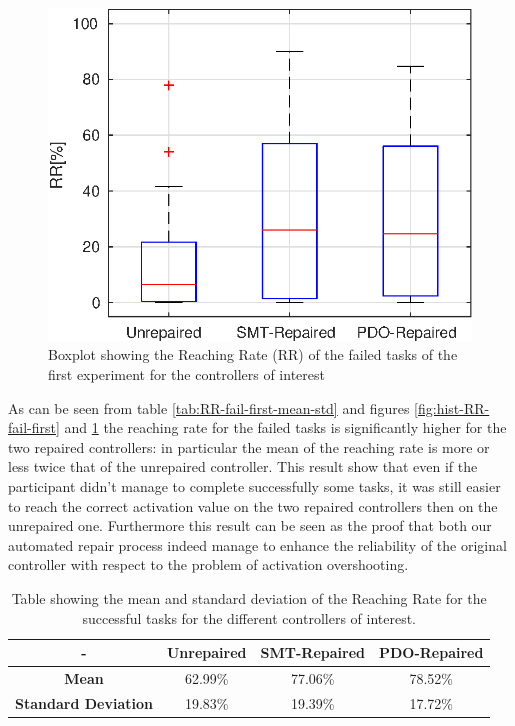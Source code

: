 \begin{figure}[ht]
    \centering
    \includegraphics[width=\textwidth]{Images/first-experiment/exp0_RR_fail_box.eps}
    \caption{Boxplot showing the Reaching Rate (RR) of the failed tasks of the first experiment for the controllers of interest}
    \label{fig:box-RR-fail-first}
\end{figure}
As can be seen from table \ref{tab:RR-fail-first-mean-std} and figures \ref{fig:hist-RR-fail-first} and \ref{fig:box-RR-fail-first} the reaching rate for the failed tasks is significantly higher for the two repaired controllers: in particular the mean of the reaching rate is more or less twice that of the unrepaired controller. This result show that  even if the participant didn't manage to complete successfully some tasks, it was still easier to reach the correct activation value on the two repaired controllers then on the unrepaired one. Furthermore this result can be seen as the proof that both our automated repair process indeed manage to enhance the reliability of the original controller with respect to the problem of activation overshooting.
%
%
\begin{table}[ht]
    \centering
    \begin{tabular}{|c|c|c|c|}
        \hline
        - & \textbf{Unrepaired} & \textbf{SMT-Repaired} & \textbf{PDO-Repaired} \\
        \hline
        \textbf{Mean} & 62.99\% & 77.06\% & 78.52\% \\
        \textbf{Standard Deviation} & 19.83\% & 19.39\% & 17.72\% \\
        \hline
    \end{tabular}
    \caption{Table showing the mean and standard deviation of the Reaching Rate for the successful tasks for the different controllers of interest.}
    \label{tab:RR-succ-first-mean-std}
\end{table}
